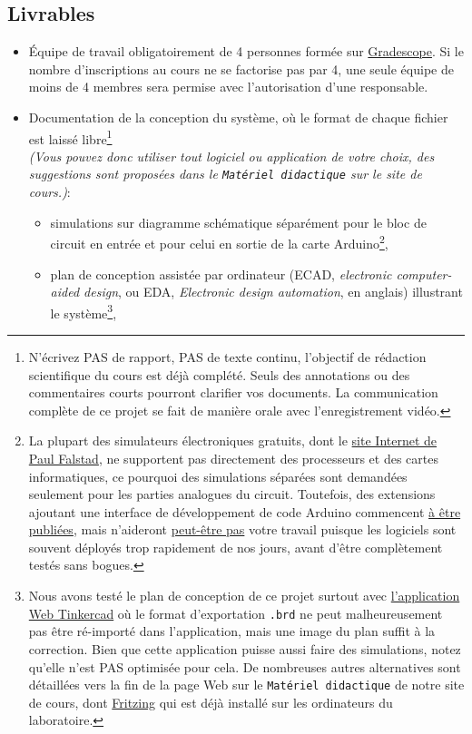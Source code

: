 \documentclass[english,french,12pt]{article}
\begin{document}
\subsection*{Livrables}
\label{subsec:livrables}
\begin{itemize}
    \item Équipe de travail obligatoirement de 4 personnes formée sur \href{https://www.gradescope.com/}{Gradescope}. Si le nombre d'inscriptions au cours ne se factorise pas par 4, une seule équipe de moins de 4 membres sera permise avec l'autorisation d'une responsable.
    \item Documentation de la conception du système, où le format de chaque fichier est laissé libre\footnote{N'écrivez PAS de rapport, PAS de texte continu, l'objectif de rédaction scientifique du cours est déjà complété. Seuls des annotations ou des commentaires courts pourront clarifier vos documents. La communication complète de ce projet se fait de manière orale avec l'enregistrement vidéo.}\\ \textit{(Vous pouvez donc utiliser tout logiciel ou application de votre choix, des suggestions sont proposées dans le \texttt{Matériel didactique} sur le site de cours.)}:
    \begin{itemize}[label=$\bullet$]
        \item simulations sur diagramme schématique séparément pour le bloc de circuit en entrée et pour celui en sortie de la carte Arduino\footnote{La plupart des simulateurs électroniques gratuits, dont le \href{https://www.falstad.com/circuit/}{site Internet de Paul Falstad}, ne supportent pas directement des processeurs et des cartes informatiques, ce pourquoi des simulations séparées sont demandées seulement pour les parties analogues du circuit. Toutefois, des extensions ajoutant une interface de développement de code Arduino commencent \href{http://falstad.com/circuit/avr8js/}{à être publiées}, mais n'aideront \href{https://hackaday.com/2021/06/11/circuit-vr-arduino-virtually-meets-analog/}{peut-être pas} votre travail puisque les logiciels sont souvent déployés trop rapidement de nos jours, avant d'être complètement testés sans bogues.},
        \item plan de conception assistée par ordinateur (ECAD, \textit{electronic computer-aided design}, ou EDA, \textit{Electronic design automation}, en anglais) illustrant le système\footnote{Nous avons testé le plan de conception de ce projet surtout avec \href{https://www.tinkercad.com/login}{l'application Web Tinkercad} où le format d'exportation \texttt{.brd} ne peut malheureusement pas être ré-importé dans l'application, mais une image du plan suffit à la correction. Bien que cette application puisse aussi faire des simulations, notez qu'elle n'est PAS optimisée pour cela. De nombreuses autres alternatives sont détaillées vers la fin de la page Web sur le \texttt{Matériel didactique} de notre site de cours, dont \href{https://fritzing.org/}{Fritzing} qui est déjà installé sur les ordinateurs du laboratoire.},

\end{itemize}
\end{itemize}
\end{document}
